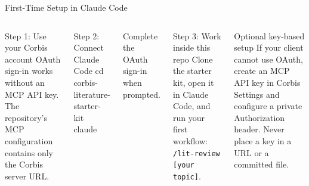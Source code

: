 \documentclass[aspectratio=169,professionalfonts]{beamer}
\begin{document}
\begin{frame}[t]{First-Time Setup in Claude Code}
\small
\begin{columns}[T,onlytextwidth]
\begin{block}{Step 1: Use your Corbis account}
OAuth sign-in works without an MCP API key. The repository's MCP configuration contains only the Corbis server URL.
\end{block}
\begin{block}{Step 2: Connect Claude Code}
{\scriptsize\ttfamily
cd corbis-literature-starter-kit\\
claude
}
\end{block}
Complete the OAuth sign-in when prompted.
\begin{block}{Step 3: Work inside this repo}
Clone the starter kit, open it in Claude Code, and run your first workflow: \texttt{/lit-review [your topic]}.
\end{block}
\begin{exampleblock}{Optional key-based setup}
If your client cannot use OAuth, create an MCP API key in Corbis Settings and configure a private Authorization header. Never place a key in a URL or a committed file.
\end{exampleblock}
\end{columns}
\end{frame}
\end{document}
